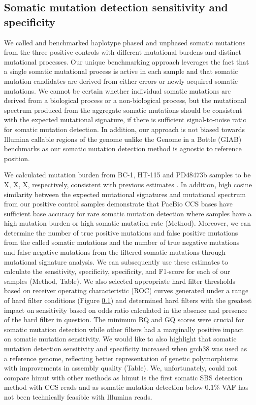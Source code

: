 \subsection{Somatic mutation detection sensitivity and specificity}

We called and benchmarked haplotype phased and unphased somatic mutations from the three positive controls with different mutational burdens and distinct mutational processes. Our unique benchmarking approach leverages the fact that a single somatic mutational process is active in each sample and that somatic mutation candidates are derived from either errors or newly acquired somatic mutations. We cannot be certain whether individual somatic mutations are derived from a biological process or a non-biological process, but the mutational spectrum produced from the aggregate somatic mutations should be consistent with the expected mutational signature, if there is sufficient signal-to-noise ratio for somatic mutation detection. In addition, our approach is not biased towards Illumina callable regions of the genome unlike the Genome in a Bottle (GIAB) benchmarks \cite{} as our somatic mutation detection method is agnostic to reference position. 

We calculated mutation burden from BC-1, HT-115 and PD48473b samples to be X, X, X, respectively, consistent with previous estimates \cite{}. In addition, high cosine similarity between the expected mutational signatures and mutational spectrum from our positive control samples demonstrate that PacBio CCS bases have sufficient base accuracy for rare somatic mutation detection where samples have a high mutation burden or high somatic mutation rate (Method). Moreover, we can determine the number of true positive mutations and false positive mutations from the called somatic mutations and the number of true negative mutations and false negative mutations from the filtered somatic mutations through mutational signature analysis. We can subsequently use these estimates to calculate the sensitivity, specificity, specificity, and F1-score for each of our samples (Method, Table). We also selected appropriate hard filter thresholds based on receiver operating characteristic (ROC) curves generated under a range of hard filter conditions (Figure \ref{}) and determined hard filters with the greatest impact on sensitivity based on odds ratio calculated in the absence and presence of the hard filter in question. The minimum BQ and GQ scores were crucial for somatic mutation detection while other filters had a marginally positive impact on somatic mutation sensitivity. We would like to also highlight that somatic mutation detection sensitivity and specificity increased when grch38 was used as a reference genome, reflecting better representation of genetic polymorphisms with improvements in assembly quality (Table). We, unfortunately, could not compare himut with other methods as himut is the first somatic SBS detection method with CCS reads and as somatic mutation detection below 0.1\% VAF has not been technically feasible with Illumina reads. 

